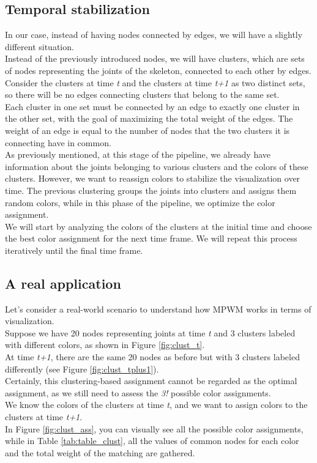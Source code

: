 \subsection{Temporal stabilization}
In our case, instead of having nodes connected by edges, we will have a slightly different situation. \\   
Instead of the previously introduced nodes, we will have clusters, which are sets of nodes representing the joints of the skeleton, connected to each other by edges.
\\  
Consider the clusters at time \textit{t} and the clusters at time \textit{t+1} as two distinct sets, so there will be no edges connecting clusters that belong to the same set.\\
Each cluster in one set must be connected by an edge to exactly one cluster in the other set, with the goal of maximizing the total weight of the edges.
The weight of an edge is equal to the number of nodes that the two clusters it is connecting have in common.\\
As previously mentioned, at this stage of the pipeline, we already have information about the joints belonging to various clusters and the colors of these clusters. However, we want to reassign colors to stabilize the visualization over time.
The previous clustering groups the joints into clusters and assigns them random colors, while in this phase of the pipeline, we optimize the color assignment.\\
We will start by analyzing the colors of the clusters at the initial time and choose the best color assignment for the next time frame.
We will repeat this process iteratively until the final time frame.


\subsection{A real application}
Let's consider a real-world scenario to understand how MPWM works in terms of visualization. \\
Suppose we have 20 nodes representing joints at time \textit{t} and 3 clusters labeled with different colors, as shown in Figure \ref{fig:clust_t}. \\
At time \textit{t+1}, there are the same 20 nodes as before but with 3 clusters labeled differently (see Figure \ref{fig:clust_tplus1}).  \\
Certainly, this clustering-based assignment cannot be regarded as the optimal assignment, as we still need to assess the \textit{3!} possible color assignments. \\
We know the colors of the clusters at time \textit{t}, and we want to assign colors to the clusters at time \textit{t+1}. \\
In Figure \ref{fig:clust_ass}, you can visually see all the possible color assignments, while in Table \ref{tab:table_clust}, all the values of common nodes for each color and the total weight of the matching are gathered.


